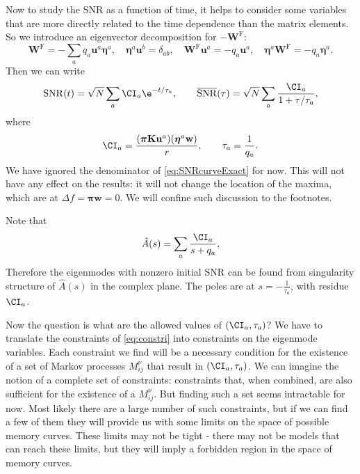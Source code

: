 \documentclass[12pt]{article}
\newcommand{\eqm}{\pi}
\newcommand{\eq}{\boldsymbol{\eqm}}
\newcommand{\wm}{w}
\newcommand{\w}{\mathbf{\wm}}
\newcommand{\Wm}{W}
\newcommand{\W}{\mathbf{\Wm}}
\newcommand{\MMdm}{M}
\newcommand{\encm}{K}
\newcommand{\enc}{\mathbf{\encm}}
\newcommand{\frg}{\W^{\mathrm{F}}}
\newcommand{\evrm}{u}
\newcommand{\evr}{\mathbf{\evrm}}
\newcommand{\evlm}{\eta}
\newcommand{\evl}{\boldsymbol{\evlm}}
\DeclareMathOperator{\snr}{SNR}
\newcommand{\snrb}{\overline{\snr}}
\begin{document}
Now to study the SNR as a function of  time, it helps to consider some variables that are more directly related to the time dependence than the matrix elements. 
So we introduce an eigenvector decomposition for \(-\frg\):
%
\begin{equation}\label{eq:eigendecomp}
  \frg = - \sum_a q_a \evr^a \evl^a,
  \quad
  \evl^a \evr^b = \delta_{ab},
  \quad
  \frg \evr^a = -q_a \evr^a,
  \quad
  \evl^a \frg = -q_a \evl^a.
\end{equation}
%
Then we can write
%
\begin{equation}\label{eq:snreig}
  \snr(t) = \sqrt{N}\sum_a \CI_a \e^{-t/\tau_a},
  \qquad
  \snrb(\tau) = \sqrt{N}\sum_a \frac{\CI_a}{1+\tau/\tau_a},
\end{equation}
%
where
%
\begin{equation}\label{eq:snrcoeffs}
  \CI_a = \frac{(\eq \enc \evr^a) (\evl^a \w)}{r},
  \qquad
  \tau_a = \frac{1}{q_a}.
\end{equation}
%
We have ignored the denominator of \cref{eq:SNRcurveExact} for now.
This will not have any effect on the results: it will not change the location of the maxima, which are at \( \Delta f = \eq \w = 0 \).
We will confine such discussion to the footnotes.

Note that
%
\begin{equation}\label{eq:laplaceeig}
  \hat{A}(s) = \sum_a \frac{\CI_a}{s + q_a},
\end{equation}
%
Therefore the eigenmodes with nonzero initial SNR can be found from singularity structure of \( \hat{A}(s) \) in the complex plane.
The poles are at \(s = - \frac{1}{\tau_a}\), with residue \(\CI_a\).

Now the question is what are the allowed values of \( (\CI_a, \tau_a) \)?
We have to translate the constraints of \cref{eq:constri} into constraints on the eigenmode variables.
Each constraint we find will be a necessary condition for the existence of a set of Markov processes \( \MMdm_{ij}^\nu \) that result in \( (\CI_a, \tau_a) \).
We can imagine the notion of a complete set of constraints: constraints that, when combined, are also sufficient for the existence of a \( \MMdm_{ij}^\nu \).
But finding such a set seems intractable for now.
Most likely there are a large number of such constraints, but if we can find a few of them they will provide us with some limits on the space of possible memory curves.
These limits may not be tight - there may not be models that can reach these limits, but they will imply a forbidden region in the space of memory curves.
\end{document}
